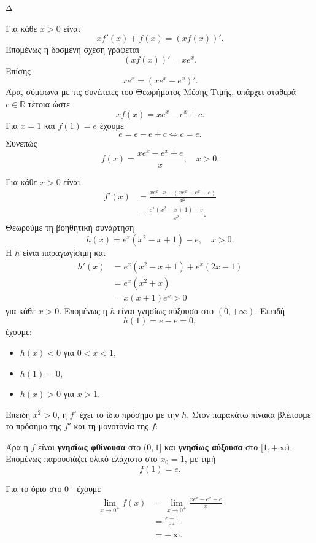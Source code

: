 \begin{thema}{Δ}
\begin{erwthma}
\item Για κάθε $x>0$ είναι
\[
xf'(x)+f(x)=(xf(x))'.
\]
Επομένως η δοσμένη σχέση γράφεται
\[
(xf(x))'=xe^x.
\]
Επίσης
\[
xe^x=(xe^x-e^x)'.
\]
Άρα, σύμφωνα με τις συνέπειες του Θεωρήματος Μέσης Τιμής, υπάρχει σταθερά $c\in\mathbb{R}$ τέτοια ώστε
\[
xf(x)=xe^x-e^x+c.
\]
Για $x=1$ και $f(1)=e$ έχουμε
\[
e=e-e+c\Leftrightarrow c=e.
\]
Συνεπώς
\[
{f(x)=\frac{xe^x-e^x+e}{x}},\quad x>0.
\]

\item Για κάθε $x>0$ είναι
\begin{align*}
f'(x)
&=\frac{xe^x\cdot x-\left(xe^x-e^x+e\right)}{x^2}\\
&=\frac{e^x(x^2-x+1)-e}{x^2}.
\end{align*}
Θεωρούμε τη βοηθητική συνάρτηση
\[
h(x)=e^x(x^2-x+1)-e,\quad x>0.
\]
Η $h$ είναι παραγωγίσιμη και
\begin{align*}
h'(x)
&=e^x(x^2-x+1)+e^x(2x-1)\\
&=e^x(x^2+x)\\
&=x(x+1)e^x>0
\end{align*}
για κάθε $x>0$. Επομένως η $h$ είναι γνησίως αύξουσα στο $(0,+\infty)$. Επειδή
\[
h(1)=e-e=0,
\]
έχουμε:
\begin{itemize}
\item $h(x)<0$ για $0<x<1$,
\item $h(1)=0$,
\item $h(x)>0$ για $x>1$.
\end{itemize}
Επειδή $x^2>0$, η $f'$ έχει το ίδιο πρόσημο με την $h$. Στον παρακάτω πίνακα βλέπουμε το πρόσημο της $f'$ και τη μονοτονία της $f$:
\begin{center}
\end{center}

Άρα η $f$ είναι \textbf{γνησίως φθίνουσα} στο $(0,1]$ και \textbf{γνησίως αύξουσα} στο $[1,+\infty)$. Επομένως παρουσιάζει ολικό ελάχιστο στο $x_0=1$, με τιμή
\[
{f(1)=e}.
\]

\item Για το όριο στο $0^+$ έχουμε
\begin{align*}
\lim_{x\to0^+}f(x)
&=\lim_{x\to0^+}\frac{xe^x-e^x+e}{x}\\
&=\frac{e-1}{0^+}\\
&=+\infty.
\end{align*}


\end{erwthma}
\end{thema}
